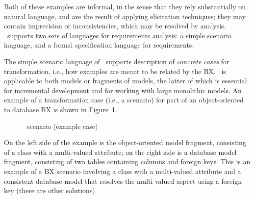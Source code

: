 Both of these examples are informal, in the sense that they rely substantially on natural language, and are the result of applying elicitation techniques; they may contain imprecision or inconsistencies, which may be resolved by analysis. \transml\ supports two sets of languages for requirements analysis: a simple scenario language, and a formal specification language for requirements. 

The simple scenario language of \transml\ supports description of \textit{concrete cases} for transformation, i.e., how examples are meant to be related by the BX. \transml\ is applicable to both models or fragments of models, the latter of which is essential for incremental development and for working with large monolithic models. An example of a transformation case (i.e., a scenario) for part of an object-oriented to database BX is shown in Figure~\ref{fig:transml-example-case}.

\begin{figure}[htbp]
\caption{\transml\ scenario (example case) \cite{GuerraLKPS13}}
\label{fig:transml-example-case}
\end{figure}

On the left side of the example is the object-oriented model fragment, consisting of a class with a multi-valued attribute; on the right side is a database model fragment, consisting of two tables containing columns and foreign keys. This is an example of a BX scenario involving a class with a multi-valued attribute and a consistent database model that resolves the multi-valued aspect using a foreign key (there are other solutions).

